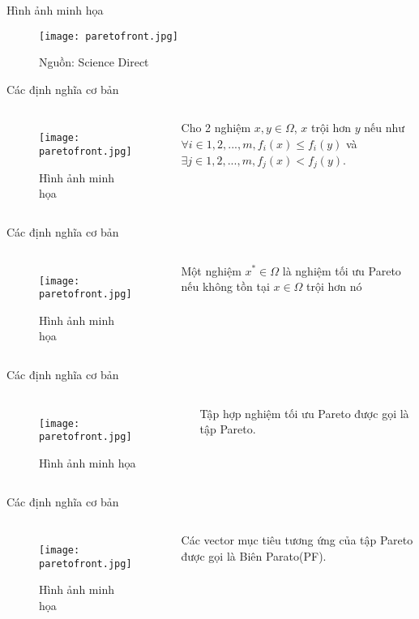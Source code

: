 \documentclass{beamer}
\begin{document}
\begin{frame}{Hình ảnh minh họa}
    \begin{figure}
    \texttt{[image: paretofront.jpg]}
    \caption{Nguồn: Science Direct}
    \end{figure}
\end{frame}
\begin{frame}{Các định nghĩa cơ bản}
    \begin{columns}
    \begin{figure}
        \centering
        \texttt{[image: paretofront.jpg]}
        \caption{Hình ảnh minh họa}
        \label{fig:my_label}
    \end{figure}
    \pause
     Cho 2 nghiệm $x,y \in \Omega $, $x$ trội hơn $y$ nếu như $\forall i \in {1,2,...,m}, f_{i}(x) \leq f_{i}(y)$ và $ \exists j \in {1,2,...,m}, f_{j}(x) < f_{j}(y)$. 
    \end{columns}
\end{frame}
\begin{frame}{Các định nghĩa cơ bản}
    \begin{columns}
    \begin{figure}
        \centering
        \texttt{[image: paretofront.jpg]}
        \caption{Hình ảnh minh họa}
        \label{fig:my_label}
    \end{figure}
     Một nghiệm $x^{*} \in \Omega$ là nghiệm tối ưu Pareto nếu không tồn tại $x \in \Omega$ trội hơn nó
    \end{columns}
\end{frame}
\begin{frame}{Các định nghĩa cơ bản}
    \begin{columns}
    \begin{figure}
        \centering
        \texttt{[image: paretofront.jpg]}
        \caption{Hình ảnh minh họa}
        \label{fig:my_label}
    \end{figure}
     Tập hợp nghiệm tối ưu Pareto được gọi là tập Pareto.
    \end{columns}
\end{frame}
\begin{frame}{Các định nghĩa cơ bản}
    \begin{columns}
    \begin{figure}
        \centering
        \texttt{[image: paretofront.jpg]}
        \caption{Hình ảnh minh họa}
        \label{fig:my_label}
    \end{figure}
    Các vector mục tiêu tương ứng của tập Pareto được gọi là Biên Parato(PF).
    \end{columns}
\end{frame}
\end{document}
